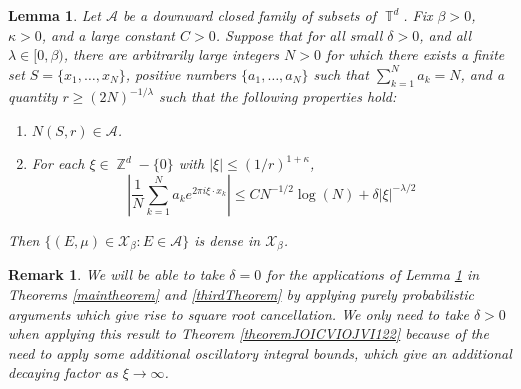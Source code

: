 \documentclass[dvipsnames,letterpaper,12pt]{article}
\numberwithin{equation}{section}
\DeclareMathOperator{\ZZ}{\mathbb{Z}}
\DeclareMathOperator{\TT}{\mathbb{T}}
\newtheorem{lemma}[theorem]{Lemma}
\newtheorem{remark}[theorem]{Remark}
\numberwithin{theorem}{section}
\begin{document}
\begin{lemma} \label{LemmaFIOAJFOIWJ}
    Let $\mathcal{A}$ be a downward closed family of subsets of $\TT^d$. Fix $\beta > 0$, $\kappa > 0$, and a large constant $C > 0$. Suppose that for all small $\delta > 0$, and all $\lambda \in [0,\beta)$, there are arbitrarily large integers $N > 0$ for which there exists a finite set $S = \{ x_1, \dots, x_N \}$, positive numbers $\{ a_1, \dots, a_N \}$ such that $\sum_{k = 1}^N a_k = N$, and a quantity $r \geq (2N)^{-1/\lambda}$ such that the following properties hold:
    \begin{enumerate}
        \item[(1)] $N(S,r) \in \mathcal{A}$.
        \item[(2)] For each $\xi \in \ZZ^d - \{ 0 \}$ with $|\xi| \leq (1/r)^{1 + \kappa}$,
        \[ \left| \frac{1}{N} \sum_{k = 1}^N a_k e^{2 \pi i \xi \cdot x_k} \right| \leq C N^{-1/2} \log(N) + \delta |\xi|^{-\lambda/2} \]
    \end{enumerate}
    Then $\{ (E,\mu) \in \mathcal{X}_\beta : E \in \mathcal{A} \}$ is dense in $\mathcal{X}_\beta$.
\end{lemma}

\begin{remark}
    We will be able to take $\delta = 0$ for the applications of Lemma \ref{LemmaFIOAJFOIWJ} in Theorems \ref{maintheorem} and \ref{thirdTheorem} by applying purely probabilistic arguments which give rise to square root cancellation. We only need to take $\delta > 0$ when applying this result to Theorem \ref{theoremJOICVIOJVI122} because of the need to apply some additional oscillatory integral bounds, which give an additional decaying factor as $\xi \to \infty$.
\end{remark}
\end{document}
